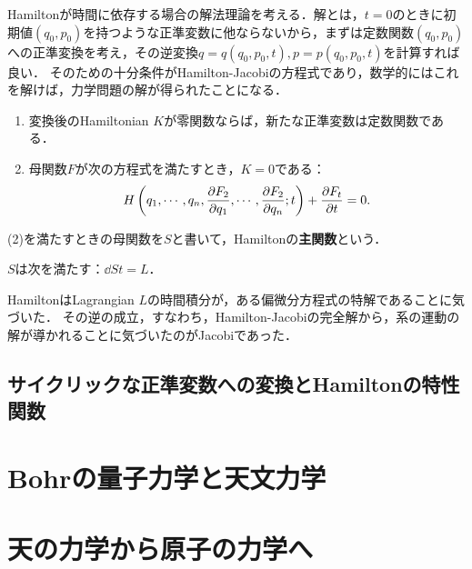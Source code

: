 \documentclass[uplatex, dvipdfmx]{jsreport}
\begin{document}
\begin{tcolorbox}[colframe=ForestGreen, colback=ForestGreen!10!white,breakable,colbacktitle=ForestGreen!40!white,coltitle=black,fonttitle=\bfseries\sffamily,
title=]
    Hamiltonが時間に依存する場合の解法理論を考える．解とは，$t=0$のときに初期値$(q_0,p_0)$を持つような正準変数に他ならないから，まずは定数関数$(q_0,p_0)$への正準変換を考え，その逆変換$q=q(q_0,p_0,t),p=p(q_0,p_0,t)$を計算すれば良い．
    そのための十分条件がHamilton-Jacobiの方程式であり，数学的にはこれを解けば，力学問題の解が得られたことになる．
\end{tcolorbox}

\begin{theorem}\mbox{}
    \begin{enumerate}
        \item 変換後のHamiltonian $K$が零関数ならば，新たな正準変数は定数関数である．
        \item 母関数$F$が次の方程式を満たすとき，$K=0$である：
        \[H\left(q_1,\cdots,q_n,\frac{\partial F_2}{\partial q_1},\cdots,\frac{\partial F_2}{\partial q_n};t\right)+\frac{\partial F_t}{\partial t}=0.\]
    \end{enumerate}
    (2)を満たすときの母関数を$S$と書いて，Hamiltonの\textbf{主関数}という．
\end{theorem}

\begin{corollary}
    $S$は次を満たす：$\dd{S}{t}=L$．
\end{corollary}

\begin{history}
    HamiltonはLagrangian $L$の時間積分が，ある偏微分方程式の特解であることに気づいた．
    その逆の成立，すなわち，Hamilton-Jacobiの完全解から，系の運動の解が導かれることに気づいたのがJacobiであった．
\end{history}

\subsection{サイクリックな正準変数への変換とHamiltonの特性関数}

\section{Bohrの量子力学と天文力学}

\section{天の力学から原子の力学へ}
\end{document}

